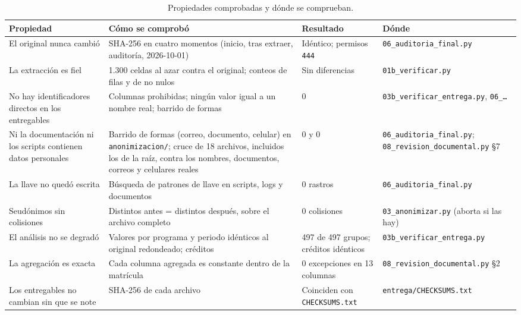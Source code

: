 \documentclass[11pt,a4paper,twoside,twocolumn]{article}
\newcommand{\cod}[1]{\nolinkurl{#1}}
\newcommand{\cab}[1]{\textcolor{ustaAzul}{\textbf{#1}}}
\begin{document}
\begin{table}[tp]
\centering
\caption{Propiedades comprobadas y dónde se comprueban.}
\label{tab:comprobado}
\footnotesize
\setlength{\tabcolsep}{4pt}
\begin{tabularx}{\textwidth}{@{}P{3.5cm} L P{3.0cm} P{3.6cm}@{}}
\toprule
\cab{Propiedad} & \cab{Cómo se comprobó} & \cab{Resultado} & \cab{Dónde} \\
\midrule
El original nunca cambió & SHA-256 en cuatro momentos (inicio, tras extraer, auditoría, 2026-10-01) & Idéntico; permisos \cod{444} & \cod{06_auditoria_final.py} \\
La extracción es fiel & 1.300 celdas al azar contra el original; conteos de filas y de no nulos & Sin diferencias & \cod{01b_verificar.py} \\
No hay identificadores directos en los entregables & Columnas prohibidas; ningún valor igual a un nombre real; barrido de formas & 0 & \cod{03b_verificar_entrega.py}, \texttt{06\_…} \\
Ni la documentación ni los scripts contienen datos personales & Barrido de formas (correo, documento, celular) en \cod{anonimizacion/}; cruce de 18 archivos, incluidos los de la raíz, contra los nombres, documentos, correos y celulares reales & 0 y 0 & \cod{06_auditoria_final.py}; \cod{08_revision_documental.py} §7 \\
La llave no quedó escrita & Búsqueda de patrones de llave en scripts, logs y documentos & 0 rastros & \cod{06_auditoria_final.py} \\
Seudónimos sin colisiones & Distintos antes = distintos después, sobre el archivo completo & 0 colisiones & \cod{03_anonimizar.py} (aborta si las hay) \\
El análisis no se degradó & Valores por programa y periodo idénticos al original redondeado; créditos & 497 de 497 grupos; créditos idénticos & \cod{03b_verificar_entrega.py} \\
La agregación es exacta & Cada columna agregada es constante dentro de la matrícula & 0 excepciones en 13 columnas & \cod{08_revision_documental.py} §2 \\
Los entregables no cambian sin que se note & SHA-256 de cada archivo & Coinciden con \cod{CHECKSUMS.txt} & \cod{entrega/CHECKSUMS.txt} \\
\bottomrule
\end{tabularx}
\end{table}

\end{document}
